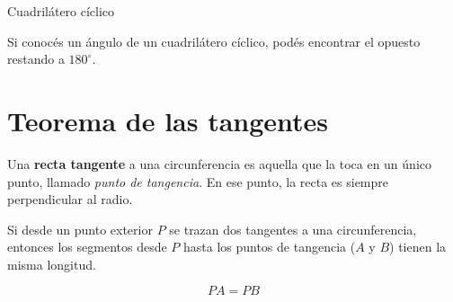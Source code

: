 \documentclass[12pt]{article}
\newcommand{\observa}[1]{%
    \begin{tcolorbox}[colback=amarilloSuave, colframe=naranjaEureka, title=Observa y piensa]
    #1
    \end{tcolorbox}
}
\begin{document}
    \begin{center}

        Cuadrilátero cíclico
    \end{center}

    \observa{Si conocés un ángulo de un cuadrilátero cíclico, podés encontrar el opuesto restando a $180^\circ$.}

    \section{Teorema de las tangentes}

    \begin{idea}
        Una \textbf{recta tangente} a una circunferencia es aquella que la toca en un único punto, llamado \textit{punto de tangencia}. En ese punto, la recta es siempre perpendicular al radio.
    \end{idea}

    Si desde un punto exterior $P$ se trazan dos tangentes a una circunferencia, entonces los segmentos desde $P$ hasta los puntos de tangencia ($A$ y $B$) tienen la misma longitud.

    \[ PA = PB \]
\end{document}
